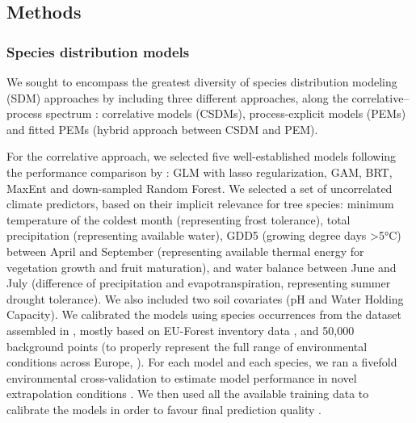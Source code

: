\documentclass[letterpaper,8pt]{extarticle}  %
\begin{document}
\begin{doublespacing}
\begin{linenumbers}
\clearpage

\subsection{Methods}

\subsubsection{Species distribution models}

We sought to encompass the greatest diversity of species distribution modeling (SDM) approaches by including three different approaches, along the correlative–process spectrum \citep{Dormann2012}: correlative models (CSDMs), process-explicit models (PEMs) and fitted PEMs (hybrid approach between CSDM and PEM).

For the correlative approach, we selected five well-established models following the performance comparison by \cite{Valavi2022}: GLM with lasso regularization, GAM, BRT, MaxEnt and down-sampled Random Forest. We selected a set of uncorrelated climate predictors, based on their implicit relevance for tree species: minimum temperature of the coldest month (representing frost tolerance), total precipitation (representing available water), GDD5 (growing degree days \textgreater5°C) between April and September (representing available thermal energy for vegetation growth and fruit maturation), and water balance between June and July (difference of precipitation and evapotranspiration, representing summer drought tolerance). We also included two soil covariates (pH and Water Holding Capacity). We calibrated the models using species occurrences from the dataset assembled in \cite{VanderMeersch2023}, mostly based on EU-Forest inventory data \citep{Mauri2017}, and 50,000 background points (to properly represent the full range of environmental conditions across Europe, \citealp{Valavi2022}). For each model and each species, we ran a fivefold environmental cross-validation to estimate model performance in novel extrapolation conditions \citep{Roberts2017}. We then used all the available training data to calibrate the models in order to favour final prediction quality \citep{Roberts2017}.


\end{linenumbers}
\end{doublespacing}
\end{document}

